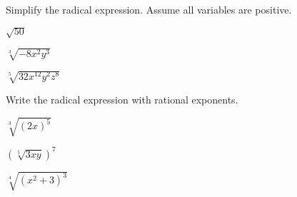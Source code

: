 \vfill
\begin{center} \hfill
\end{center}

\newpage

\begin{exercise}Simplify the radical expression. Assume all variables are positive. \\
	\begin{enumerate*}[label={(\arabic*)~}]
		\item \parbox{0.25\textwidth}{$\sqrt{50}$}
		\item \parbox{0.25\textwidth}{$\sqrt[3]{-8x^2y^3}$}
		\item \parbox{0.25\textwidth}{$\sqrt[5]{32x^{12}y^2z^8}$}\hfill\null
	\end{enumerate*}
\end{exercise}

\vfill
\begin{center} \hfill
\end{center}

\begin{exercise}
	Write the radical expression with rational exponents.
	\\
	\begin{enumerate*}[label={(\arabic*)~}]
		\item $\sqrt[3]{(2x)^5}$
		\item $(\sqrt[5]{3xy})^7$
		\item $\sqrt[4]{(x^2+3)^3}$
		\hfill\null
	\end{enumerate*}
\end{exercise}


